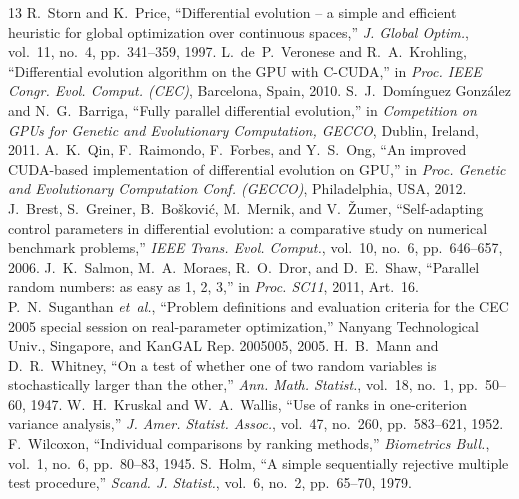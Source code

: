 \documentclass[conference]{IEEEtran}
\begin{document}
\begin{thebibliography}{13}
 R.~Storn and K.~Price, ``Differential evolution -- a simple and efficient heuristic for global optimization over continuous spaces,'' \emph{J. Global Optim.}, vol.~11, no.~4, pp.~341--359, 1997.
 L.~de~P.~Veronese and R.~A.~Krohling, ``Differential evolution algorithm on the GPU with C-CUDA,'' in \emph{Proc. IEEE Congr. Evol. Comput. (CEC)}, Barcelona, Spain, 2010.
 S.~J.~Dom\'inguez Gonz\'alez and N.~G.~Barriga, ``Fully parallel differential evolution,'' in \emph{Competition on GPUs for Genetic and Evolutionary Computation, GECCO}, Dublin, Ireland, 2011.
 A.~K.~Qin, F.~Raimondo, F.~Forbes, and Y.~S.~Ong, ``An improved CUDA-based implementation of differential evolution on GPU,'' in \emph{Proc. Genetic and Evolutionary Computation Conf. (GECCO)}, Philadelphia, USA, 2012.
 J.~Brest, S.~Greiner, B.~Bo\v{s}kovi\'c, M.~Mernik, and V.~\v{Z}umer, ``Self-adapting control parameters in differential evolution: a comparative study on numerical benchmark problems,'' \emph{IEEE Trans. Evol. Comput.}, vol.~10, no.~6, pp.~646--657, 2006.
 J.~K.~Salmon, M.~A.~Moraes, R.~O.~Dror, and D.~E.~Shaw, ``Parallel random numbers: as easy as 1, 2, 3,'' in \emph{Proc. SC11}, 2011, Art.~16.
 P.~N.~Suganthan \emph{et~al.}, ``Problem definitions and evaluation criteria for the CEC 2005 special session on real-parameter optimization,'' Nanyang Technological Univ., Singapore, and KanGAL Rep. 2005005, 2005.
 H.~B.~Mann and D.~R.~Whitney, ``On a test of whether one of two random variables is stochastically larger than the other,'' \emph{Ann. Math. Statist.}, vol.~18, no.~1, pp.~50--60, 1947.
 W.~H.~Kruskal and W.~A.~Wallis, ``Use of ranks in one-criterion variance analysis,'' \emph{J. Amer. Statist. Assoc.}, vol.~47, no.~260, pp.~583--621, 1952.
 F.~Wilcoxon, ``Individual comparisons by ranking methods,'' \emph{Biometrics Bull.}, vol.~1, no.~6, pp.~80--83, 1945.
 S.~Holm, ``A simple sequentially rejective multiple test procedure,'' \emph{Scand. J. Statist.}, vol.~6, no.~2, pp.~65--70, 1979.
\end{thebibliography}
\end{document}
